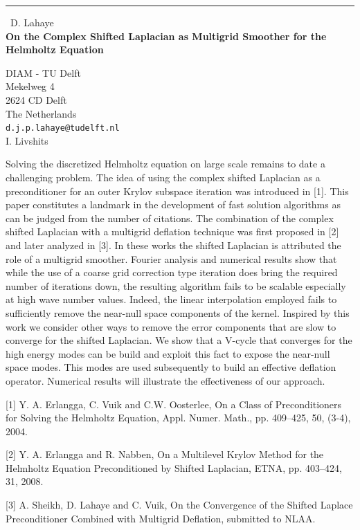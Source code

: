 \documentclass{report}
\begin{document}
\begin{center}
\rule{6in}{1pt} \
{\large D. Lahaye \\
{\bf On the Complex Shifted Laplacian as Multigrid Smoother for the Helmholtz Equation }}

DIAM - TU Delft \\ Mekelweg 4 \\ 2624 CD Delft \\ The Netherlands
\\
{\tt d.j.p.lahaye@tudelft.nl}\\
I. Livshits\end{center}

Solving the discretized Helmholtz equation on large scale remains to date a
challenging problem. The idea of using the complex shifted Laplacian as a
preconditioner for an outer Krylov subspace iteration was introduced in [1].
This paper constitutes a landmark in the development of fast solution
algorithms as can be judged from the number of citations. The combination
of the complex shifted Laplacian with a multigrid deflation technique was
first proposed in [2] and later analyzed in [3]. In these works the shifted
Laplacian is attributed the role of a multigrid smoother. Fourier analysis
and numerical results show that while the use of a coarse grid correction
type iteration does bring the required number of iterations down, the
resulting algorithm fails to be scalable especially at high wave number
values. Indeed, the linear interpolation employed fails to sufficiently
remove the near-null space components of the kernel. Inspired by this work
we consider other ways to remove the error components that are slow to
converge for the shifted Laplacian. We show that a V-cycle that converges
for the high energy modes can be build and exploit this fact to expose the
near-null space modes. This modes are used subsequently to build an effective
deflation operator. Numerical results will illustrate the effectiveness of
our approach.

[1] Y. A. Erlangga, C. Vuik and C.W. Oosterlee, On a Class of Preconditioners
for Solving the Helmholtz Equation, Appl. Numer. Math., pp. 409--425, 50,
(3-4), 2004.

[2] Y. A. Erlangga and R. Nabben, On a Multilevel Krylov Method for the
Helmholtz Equation Preconditioned by Shifted Laplacian, ETNA, pp. 403--424,
31, 2008.

[3] A. Sheikh, D. Lahaye and C. Vuik, On the Convergence of the Shifted
Laplace Preconditioner Combined with Multigrid Deflation, submitted to NLAA.
\end{document}
